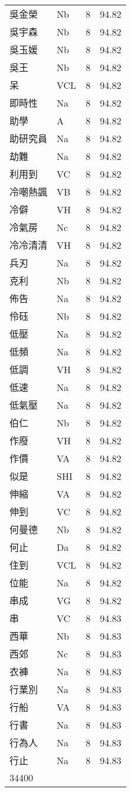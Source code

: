 \documentclass[twocolumn]{book}
\begin{document}
\begin{supertabular}{llrr}
吳金榮 & Nb & 8 &  94.82\\
吳宇森 & Nb & 8 &  94.82\\
吳玉媛 & Nb & 8 &  94.82\\
吳王 & Nb & 8 &  94.82\\
呆 & VCL & 8 &  94.82\\
即時性 & Na & 8 &  94.82\\
助學 & A & 8 &  94.82\\
助研究員 & Na & 8 &  94.82\\
劫難 & Na & 8 &  94.82\\
利用到 & VC & 8 &  94.82\\
冷嘲熱諷 & VB & 8 &  94.82\\
冷僻 & VH & 8 &  94.82\\
冷氣房 & Nc & 8 &  94.82\\
冷冷清清 & VH & 8 &  94.82\\
兵刃 & Na & 8 &  94.82\\
克利 & Nb & 8 &  94.82\\
佈告 & Na & 8 &  94.82\\
伶砡 & Nb & 8 &  94.82\\
低壓 & Na & 8 &  94.82\\
低頻 & Na & 8 &  94.82\\
低調 & VH & 8 &  94.82\\
低速 & Na & 8 &  94.82\\
低氣壓 & Na & 8 &  94.82\\
伯仁 & Nb & 8 &  94.82\\
作廢 & VH & 8 &  94.82\\
作價 & VA & 8 &  94.82\\
似是 & SHI & 8 &  94.82\\
伸縮 & VA & 8 &  94.82\\
伸到 & VC & 8 &  94.82\\
何曼德 & Nb & 8 &  94.82\\
何止 & Da & 8 &  94.82\\
住到 & VCL & 8 &  94.82\\
位能 & Na & 8 &  94.82\\
串成 & VG & 8 &  94.82\\
串 & VC & 8 &  94.83\\
西華 & Nb & 8 &  94.83\\
西郊 & Nc & 8 &  94.83\\
衣褲 & Na & 8 &  94.83\\
行業別 & Na & 8 &  94.83\\
行船 & VA & 8 &  94.83\\
行書 & Na & 8 &  94.83\\
行為人 & Na & 8 &  94.83\\
行止 & Na & 8 &  94.83\\
34400\\
\end{supertabular} 
\end{document}
